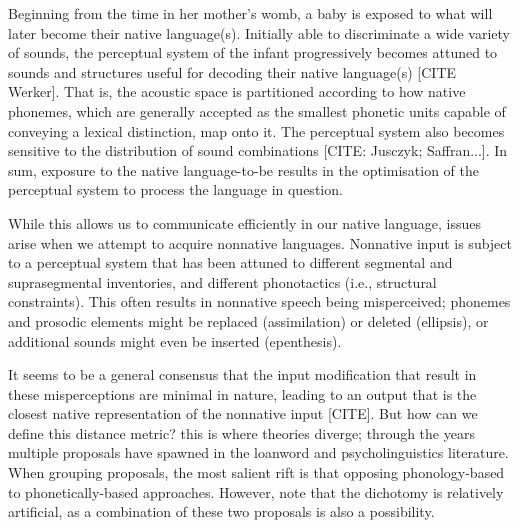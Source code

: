 



Beginning from the time in her mother's womb, a baby is exposed to what will later become their native language(s). Initially able to discriminate a wide variety of sounds, the perceptual system of the infant progressively becomes attuned to sounds and structures useful for decoding their native language(s) [CITE Werker]. That is, the acoustic space is partitioned according to how native phonemes, which are generally accepted as the smallest phonetic units capable of conveying a lexical distinction, map onto it. The perceptual system also becomes sensitive to the distribution of sound combinations [CITE: Jusczyk; Saffran...]. In sum, exposure to the native language-to-be results in the optimisation of the perceptual system to process the language in question.

While this allows us to communicate efficiently in our native language, issues arise when we attempt to acquire nonnative languages. Nonnative input is subject to a perceptual system that has been attuned to different segmental and suprasegmental inventories, and different phonotactics (i.e., structural constraints). This often results in nonnative speech being misperceived; phonemes and prosodic elements might be replaced (assimilation) or deleted (ellipsis), or additional sounds might even be inserted (epenthesis).

It seems to be a general consensus that the input modification that result in these misperceptions are minimal in nature, leading to an output that is the closest native representation of the nonnative input [CITE]. But how can we define this distance metric? this is where theories diverge; through the years multiple proposals have spawned in the loanword and psycholinguistics literature. When grouping proposals, the most salient rift is that opposing phonology-based to phonetically-based approaches. However, note that the dichotomy is relatively artificial, as a combination of these two proposals is also a possibility.

